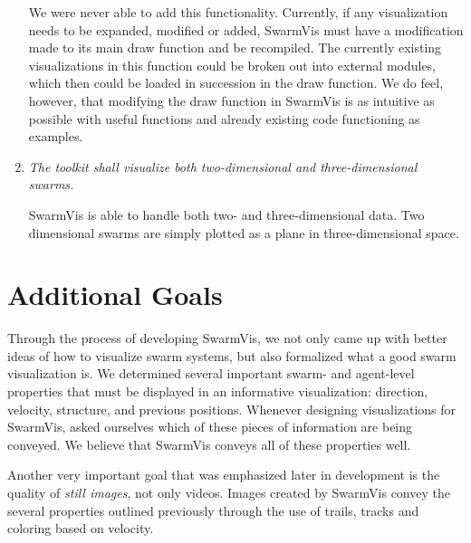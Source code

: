 \documentclass{article}
\begin{document}
\begin{enumerate}
We were never able to add this functionality. Currently, if any visualization needs to  be expanded, modified or added, SwarmVis must have a modification made to its main draw function and be recompiled. The currently existing visualizations in this function could be broken out into external modules, which then could be loaded in succession in the draw function. We do feel, however, that modifying the draw function in SwarmVis is as intuitive as possible with useful functions and already existing code functioning as examples.

\item {\em The toolkit shall visualize both two-dimensional and three-dimensional swarms.}

SwarmVis is able to handle both two- and three-dimensional data. Two dimensional swarms are simply plotted as a plane in three-dimensional space.

\end{enumerate}

\section{Additional Goals}

Through the process of developing SwarmVis, we not only came up with better ideas of how to visualize swarm systems, but also formalized what a good swarm visualization is. We determined several important swarm- and agent-level properties that must be displayed in an informative visualization: direction, velocity, structure, and previous positions. Whenever designing visualizations for SwarmVis, asked ourselves  which of these pieces of information are being conveyed. We believe that SwarmVis conveys all of these properties well.

Another very important goal that was emphasized later in development is the quality of {\em still images}, not only videos. Images created by SwarmVis convey the several properties outlined previously through the use of trails, tracks and coloring based on velocity.
\end{document}
